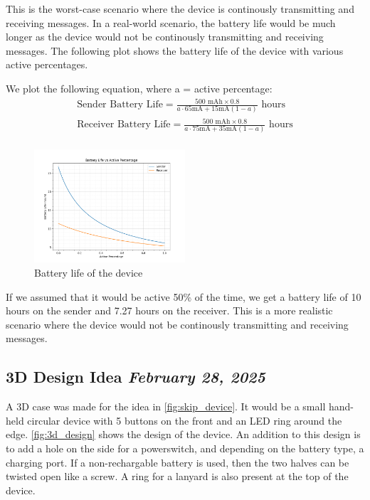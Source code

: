 \documentclass{article}
\newcommand{\logbookentry}[2]{
    \subsection*{#1 \hfill \textit{#2}} 
}
\begin{document}
This is the worst-case scenario where the device is continously transmitting and receiving messages. In a real-world scenario, the battery life would be much longer as the device would not be continously transmitting and receiving messages. The following plot shows the battery life of the device with various active percentages.

We plot the following equation, where a = active percentage:
\begin{align*}
    \text{Sender Battery Life} = \frac{500 \text{ mAh} \times 0.8}{a \cdot 65 \text{mA} + 15 \text{mA} (1-a)} \text{ hours} \\
    \text{Receiver Battery Life} = \frac{500 \text{ mAh} \times 0.8}{a \cdot 75 \text{mA} + 35 \text{mA} (1-a)} \text{ hours} \\
\end{align*}
\begin{figure}[ht!]
    \centering
    \includegraphics[width=0.5\textwidth]{battery_life.png}
    \caption{Battery life of the device}
    \label{fig:battery_life}
\end{figure}

If we assumed that it would be active 50\% of the time, we get a battery life of 10 hours on the sender and 7.27 hours on the receiver. This is a more realistic scenario where the device would not be continously transmitting and receiving messages.

\newpage
\logbookentry{3D Design Idea}{February 28, 2025}
A 3D case was made for the idea in \autoref{fig:skip_device}. It would be a small hand-held circular device with 5 buttons on the front and an LED ring around the edge. \autoref{fig:3d_design} shows the design of the device. An addition to this design is to add a hole on the side for a powerswitch, and depending on the battery type, a charging port. If a non-rechargable battery is used, then the two halves can be twisted open like a screw. A ring for a lanyard is also present at the top of the device.
\end{document}
